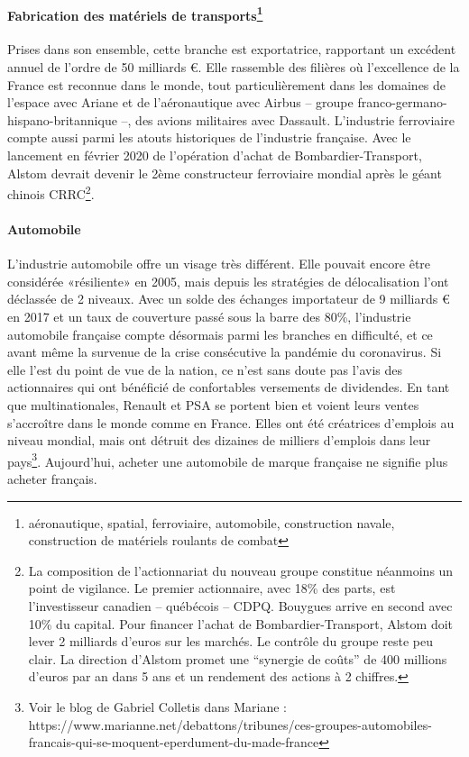 \documentclass[a4paper]{article}
\begin{document}
\paragraph{Fabrication des matériels de transports\protect\footnote{aéronautique, spatial, ferroviaire, automobile, construction navale, construction de matériels roulants de combat}}

Prises dans son ensemble, cette branche est exportatrice, rapportant un excédent annuel de l’ordre de 50 milliards €. Elle rassemble des filières où l’excellence de la France est reconnue dans le monde, tout particulièrement dans les domaines de l’espace avec Ariane et de l’aéronautique avec Airbus – groupe franco-germano-hispano-britannique –, des avions militaires avec Dassault.  L’industrie ferroviaire compte aussi parmi les atouts historiques de l’industrie française. Avec le lancement en février 2020 de l’opération d’achat de Bombardier-Transport, Alstom devrait devenir le 2ème constructeur ferroviaire mondial après le géant chinois CRRC\footnote{La composition de l’actionnariat du nouveau groupe constitue néanmoins un point de vigilance. Le premier actionnaire, avec 18\% des parts, est l’investisseur canadien – québécois – CDPQ. Bouygues arrive en second avec 10\% du capital. Pour financer l’achat de Bombardier-Transport, Alstom doit lever 2 milliards d'euros sur les marchés. Le contrôle du groupe reste peu clair. La direction d’Alstom promet une “synergie de coûts” de 400 millions d'euros par an dans 5 ans et un rendement des actions à 2 chiffres.}.  

\paragraph{Automobile}
L’industrie automobile offre un visage très différent. Elle pouvait encore être considérée «résiliente»  en 2005, mais depuis les stratégies de délocalisation l’ont déclassée de 2 niveaux. Avec un solde des échanges importateur de 9 milliards € en 2017 et un taux de couverture passé sous la barre des 80\%, l’industrie automobile française compte désormais parmi les branches en difficulté, et ce avant même la survenue de la crise consécutive  la pandémie du coronavirus. Si elle l’est du point de vue de la nation, ce n’est sans doute pas l’avis des actionnaires qui ont bénéficié de confortables versements de dividendes. En tant que multinationales, Renault et PSA se portent bien et voient leurs ventes s’accroître dans le monde comme en France. Elles ont été créatrices d’emplois au niveau mondial, mais ont détruit des dizaines de milliers d’emplois dans leur pays\footnote{Voir le blog de Gabriel Colletis dans Mariane : https://www.marianne.net/debattons/tribunes/ces-groupes-automobiles-francais-qui-se-moquent-eperdument-du-made-france}. Aujourd’hui, acheter une automobile de marque française ne signifie plus acheter français.
\end{document}

